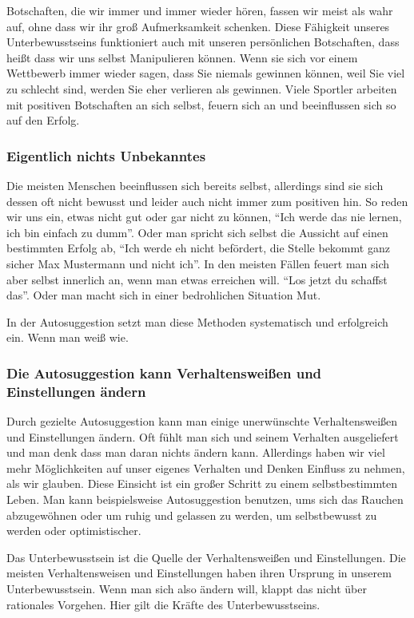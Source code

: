 Botschaften, die wir immer und immer wieder hören, fassen wir meist als wahr auf, ohne dass wir ihr
groß Aufmerksamkeit schenken. Diese Fähigkeit unseres Unterbewusstseins funktioniert auch mit unseren
persönlichen Botschaften, dass heißt dass wir uns selbst Manipulieren können. Wenn sie sich \zB vor
einem Wettbewerb immer wieder sagen, dass Sie niemals gewinnen können, weil Sie viel zu schlecht
sind, werden Sie eher verlieren als gewinnen. Viele Sportler arbeiten mit positiven Botschaften an
sich selbst, feuern sich an und beeinflussen sich so auf den Erfolg.

\subsubsection{Eigentlich nichts Unbekanntes}

Die meisten Menschen beeinflussen sich bereits selbst, allerdings sind sie sich dessen oft nicht
bewusst und leider auch nicht immer zum positiven hin. So reden wir uns \zB ein, etwas nicht gut
oder gar nicht zu können, \enquote{Ich werde das nie lernen, ich bin einfach zu dumm}. Oder man spricht sich
selbst die Aussicht auf einen bestimmten Erfolg ab, \enquote{Ich werde eh nicht befördert, die Stelle bekommt
ganz sicher Max Mustermann und nicht ich}. In den meisten Fällen feuert man sich aber selbst
innerlich an, wenn man etwas erreichen will. \enquote{Los jetzt du schaffst das}. Oder man macht sich in
einer bedrohlichen Situation Mut.

In der Autosuggestion setzt man diese Methoden systematisch und erfolgreich ein. Wenn man weiß wie.

\subsubsection{Die Autosuggestion kann  Verhaltensweißen und Einstellungen ändern}

Durch gezielte Autosuggestion kann man einige unerwünschte Verhaltensweißen und Einstellungen ändern.
Oft fühlt man sich und seinem Verhalten ausgeliefert und man denk dass man daran nichts ändern kann.
Allerdings haben wir viel mehr Möglichkeiten auf unser eigenes Verhalten und Denken Einfluss zu
nehmen, als wir glauben. Diese Einsicht ist ein großer Schritt zu einem selbstbestimmten Leben. Man
kann beispielsweise Autosuggestion benutzen, ums sich das Rauchen abzugewöhnen oder um ruhig und
gelassen zu werden, um selbstbewusst zu werden oder optimistischer.

Das Unterbewusstsein ist die Quelle der Verhaltensweißen und Einstellungen.
Die meisten Verhaltensweisen und Einstellungen haben ihren Ursprung in unserem Unterbewusstsein. Wenn
man sich also ändern will, klappt das nicht über rationales Vorgehen. Hier gilt die Kräfte des
Unterbewusstseins.

